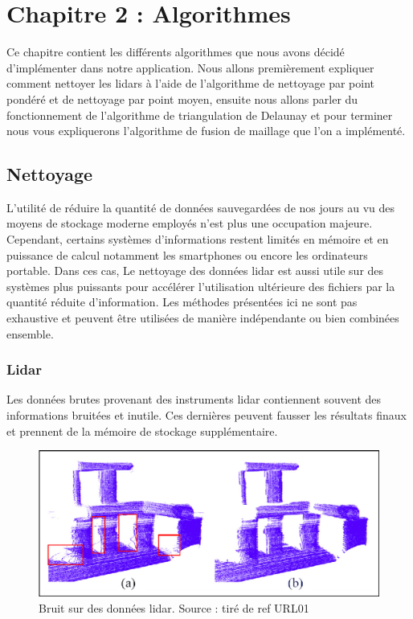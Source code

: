 \chapter{Chapitre 2 : Algorithmes}

Ce chapitre contient les différents algorithmes que nous avons décidé d'implémenter dans notre application.
Nous allons premièrement expliquer comment nettoyer les lidars à l'aide de
l'algorithme de nettoyage par point pondéré et de nettoyage par point moyen,
ensuite nous allons parler du fonctionnement de l'algorithme de triangulation de 
Delaunay et pour terminer nous vous expliquerons l'algorithme de fusion de 
maillage que l'on a implémenté.

\section{Nettoyage}

L'utilité de réduire la quantité de données sauvegardées de nos jours au vu des 
moyens de stockage moderne employés n'est plus une occupation majeure.
Cependant, certains systèmes d'informations restent limités en mémoire et en
puissance de calcul notamment les smartphones ou encore les ordinateurs portable.
Dans ces cas, 
Le nettoyage des données \gls{lidar} est aussi utile sur des systèmes plus puissants
pour accélérer l'utilisation ultérieure des fichiers par la quantité réduite
d'information.
Les méthodes présentées ici ne sont pas exhaustive et peuvent être utilisées
de manière indépendante ou bien combinées ensemble.

\subsection{Lidar}

Les données brutes provenant des instruments \gls{lidar} contiennent souvent
des informations bruitées et inutile.
Ces dernières peuvent fausser les résultats finaux et prennent de la mémoire
de stockage supplémentaire.

\begin{figure}[htbp!]
    \centering
    \includegraphics[width=0.8\linewidth]{figures/lidar noise.png}
    \caption{Bruit sur des données lidar. Source : tiré de ref URL01}
	\label{fig:lidar_noise}
\end{figure}

